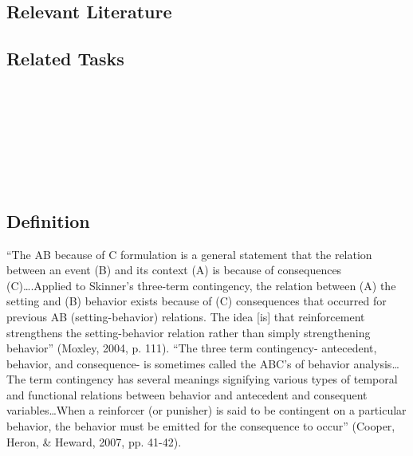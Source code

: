 \subsection{Relevant Literature}
\begin{refsection}
\nocite{test,alang2017police,clayton2018black}
\printbibliography[heading=none]
\end{refsection}
\subsection{Related Tasks}
\foureOne{}\\
\fourFKTwentyFive{}\\
\fourFKTwentySix{}\\
\fourFKTwentySeven{}\\
\fourFKTwentyEight{}\\
\fourFKTwentyNine{}\\
%
%
%
%
%
%
\section{\fourFKThirtyOne{}}
\subsection{Definition}
``The AB because of C formulation is a general statement that the relation between an event (B) and its context (A) is because of consequences (C)….Applied to Skinner's three-term contingency, the relation between (A) the setting and (B) behavior exists because of (C) consequences that occurred for previous AB (setting-behavior) relations. The idea [is] that reinforcement strengthens the setting-behavior relation rather than simply strengthening behavior'' (Moxley, 2004, p. 111).
``The three term contingency- antecedent, behavior, and consequence- is sometimes called the ABC's of behavior analysis…The term contingency has several meanings signifying various types of temporal and functional relations between behavior and antecedent and consequent variables…When a reinforcer (or punisher) is said to be contingent on a particular behavior, the behavior must be emitted for the consequence to occur'' (Cooper, Heron, \& Heward, 2007, pp. 41-42).
%
